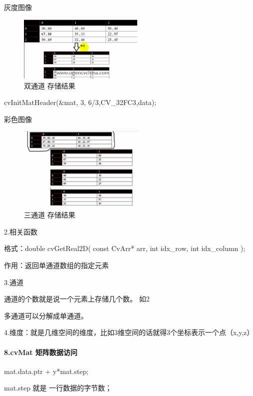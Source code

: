 \documentclass[UTF8,a4paper,8pt]{ctexart}
\begin{document}
            灰度图像
            \begin{figure}[h] 	
            	\centering
            	\includegraphics[width=6cm,clip]{doubleChannle.png} 	
            	\caption{双通道 存储结果}	
            	\label{fig:myphoto}
            \end{figure}  
            
             cvInitMatHeader(\&mat,      3,     6/3,CV\_32FC3,data); 
             
            彩色图像
             \begin{figure}[h] 	
             	\centering
             	\includegraphics[width=6cm,clip]{threeChannle.png} 	
             	\caption{三通道 存储结果}	
             	\label{fig:myphoto}
             \end{figure}  
    2.相关函数
    
    格式：double cvGetReal2D( const CvArr* arr, int idx\_row, int idx\_column );
    
    作用：返回单通道数组的指定元素
    
    
    3.通道
    
    通道的个数就是说一个元素上存储几个数。 如2
    
    多通道可以分解成单通道。
    
    
    4.维度：就是几维空间的维度，比如3维空间的话就得3个坐标表示一个点（x,y,z）
    
     \paragraph{8.cvMat 矩阵数据访问}
     
     mat.data.ptr + y*mat.step;
     
     mat.step 就是 一行数据的字节数；
     
\end{document}
